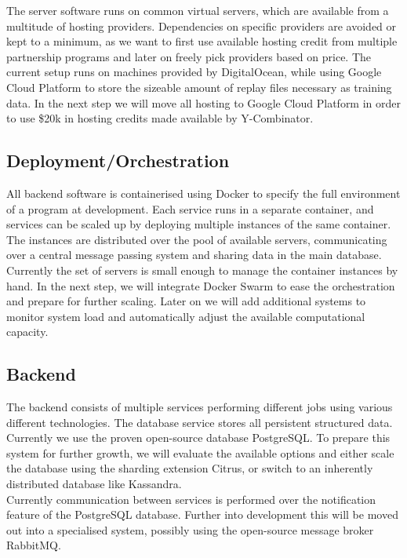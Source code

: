 \documentclass[12pt]{report} %
\begin{document}
The server software runs on common virtual servers, which are available from a multitude of hosting providers. Dependencies on specific providers are avoided or kept to a minimum, as we want to first use available hosting credit from multiple partnership programs and later on freely pick providers based on price. The current setup runs on machines provided by DigitalOcean, while using Google Cloud Platform to store the sizeable amount of replay files necessary as training data. In the next step we will move all hosting to Google Cloud Platform in order to use \$20k in hosting credits made available by Y-Combinator. 

\subsection{Deployment/Orchestration}

All backend software is containerised using Docker to specify the full environment of a program at development. Each service runs in a separate container, and services can be scaled up by deploying multiple instances of the same container. The instances are distributed over the pool of available servers, communicating over a central message passing system and sharing data in the main database.\\ 

Currently the set of servers is small enough to manage the container instances by hand. In the next step, we will integrate Docker Swarm to ease the orchestration and prepare for further scaling. Later on we will add additional systems to monitor system load and automatically adjust the available computational capacity.

\subsection{Backend}

The backend consists of multiple services performing different jobs using various different technologies. The database service stores all persistent structured data. Currently we use the proven open-source database PostgreSQL. To prepare this system for further growth, we will evaluate the available options and either scale the database using the sharding extension Citrus, or switch to an inherently distributed database like Kassandra.\\

Currently communication between services is performed over the notification feature of the PostgreSQL database. Further into development this will be moved out into a specialised system, possibly using the open-source message broker RabbitMQ.\\ 
\end{document}
